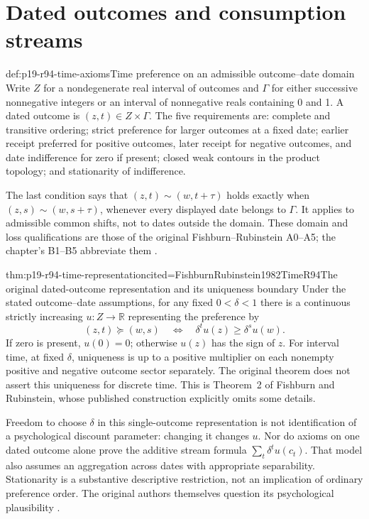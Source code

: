 \section{Dated outcomes and consumption streams}
\label{sec:p19-r94-time}

\begin{hbdefinition}{def:p19-r94-time-axioms}{Time preference on an admissible outcome--date domain}
Write \(Z\) for a nondegenerate real interval of outcomes and \(\Gamma\)
for either successive nonnegative integers or an interval of nonnegative
reals containing 0 and 1. A dated outcome is \((z,t)\in Z\times\Gamma\).
The five requirements are: complete and transitive ordering; strict
preference for larger outcomes at a fixed date; earlier receipt preferred
for positive outcomes, later receipt for negative outcomes, and date
indifference for zero if present; closed weak contours in the product
topology; and stationarity of indifference.

The last condition says that
\((z,t)\sim(w,t+\tau)\) holds exactly when
\((z,s)\sim(w,s+\tau)\), whenever every displayed date belongs to
\(\Gamma\). It applies to admissible common shifts, not to dates outside
the domain. These domain and loss qualifications are those of the original
Fishburn--Rubinstein A0--A5; the chapter's B1--B5 abbreviate them
\cite[pp.~680--681]{FishburnRubinstein1982TimeR94}
\cite[p.~567]{DhamiAlNowaihi2021Economics}.
\end{hbdefinition}

\begin{hbtheorem}{thm:p19-r94-time-representation}{cited=FishburnRubinstein1982TimeR94}{The original dated-outcome representation and its uniqueness boundary}
Under the stated outcome--date assumptions, for any fixed \(0<\delta<1\)
there is a continuous strictly increasing \(u:Z\to\mathbb R\) representing
the preference by
\[
       (z,t)\succeq(w,s)\quad\Longleftrightarrow\quad
                         \delta^t u(z)\geq\delta^s u(w).
\]
If zero is present, \(u(0)=0\); otherwise \(u(z)\) has the sign of
\(z\). For interval time, at fixed \(\delta\), uniqueness is up to
a positive multiplier on each nonempty positive and negative outcome
sector separately. The original theorem does not assert this uniqueness
for discrete time. This is Theorem~2 of Fishburn and Rubinstein, whose
published construction explicitly omits some details.
\end{hbtheorem}

Freedom to choose \(\delta\) in this single-outcome representation is
not identification of a psychological discount parameter: changing it
changes \(u\). Nor do axioms on one dated outcome alone prove the
additive stream formula \(\sum_t\delta^t u(c_t)\). That model also
assumes an aggregation across dates with appropriate separability.
Stationarity is a substantive descriptive restriction, not an implication
of ordinary preference order. The original authors themselves question
its psychological plausibility
\cite[pp.~681--686]{FishburnRubinstein1982TimeR94}.

